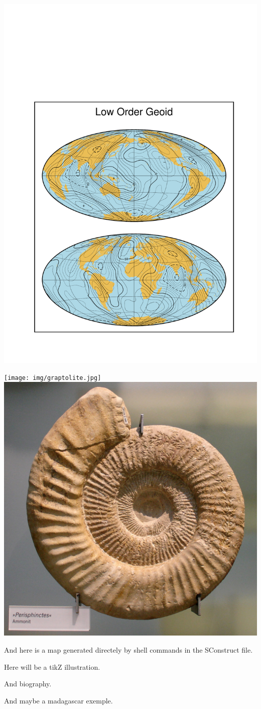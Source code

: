 \documentclass[11pt,a4paper]{article}
\begin{document}
\includegraphics[scale=0.5]{fig/map1.pdf}


\texttt{[image: img/graptolite.jpg]}
\includegraphics[scale=0.5]{img/ammonite.jpg}

And here is a map generated directely by shell commands in the SConstruct file. 


Here will be a tikZ illustration. 




And biography. 

And maybe a madagascar exemple. 
\end{document}
